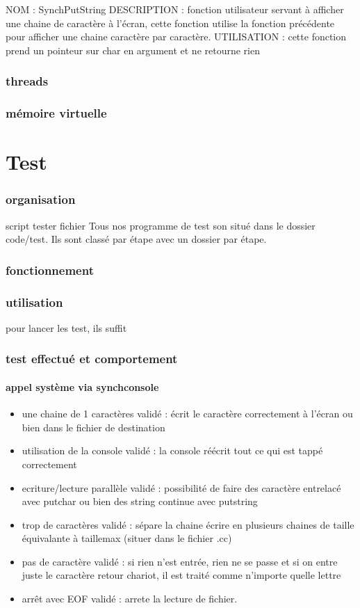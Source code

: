 NOM : SynchPutString
DESCRIPTION : fonction utilisateur servant à afficher une chaine de caractère à l'écran, cette fonction utilise la fonction précédente pour afficher une chaine caractère par caractère.
UTILISATION : cette fonction prend un pointeur sur char en argument et ne retourne rien

\section{threads}
\section{mémoire virtuelle}

\part{Test}
\section{organisation}
script
tester
fichier
Tous nos programme de test son situé dans le dossier code/test. Ils sont classé par étape avec un dossier par étape.
\section{fonctionnement}

\section{utilisation}
pour lancer les test, ils suffit 

\section{test effectué et comportement}
\subsection{appel système via synchconsole}
\begin{itemize}
\item une chaine de 1 caractères 			validé : écrit le caractère	correctement à l'écran ou bien dans le fichier de destination
\item utilisation de la console				validé : la console réécrit tout ce qui est tappé correctement
\item ecriture/lecture parallèle			validé : possibilité de faire des caractère entrelacé avec putchar ou bien des string continue avec putstring
\item trop de caractères					validé : sépare la chaine écrire en plusieurs chaines de taille équivalante à taillemax (situer dans le fichier .cc)
\item pas de caractère 						validé : si rien n'est entrée, rien ne se passe et si on entre juste le caractère retour chariot, il est traité comme n'importe quelle lettre
\item arrêt avec EOF 						validé : arrete la lecture de fichier.
\end{itemize}
